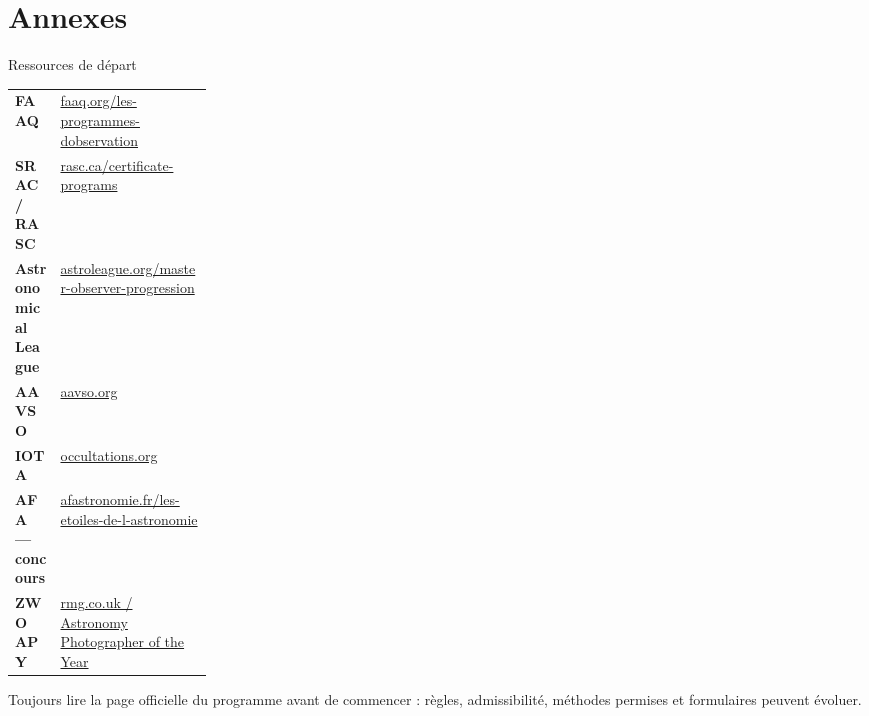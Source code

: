 \documentclass[aspectratio=169]{beamer}
\begin{document}
\appendix
\section*{Annexes}

\begin{frame}{Ressources de départ}
  \small
  \begin{tabularx}{\linewidth}{>{\bfseries}p{0.23\linewidth} X}
    FAAQ & \href{https://www.faaq.org/les-programmes-dobservation/}{faaq.org/les-programmes-dobservation} \\
    SRAC / RASC & \href{https://www.rasc.ca/certificate-programs}{rasc.ca/certificate-programs} \\
    Astronomical League & \href{https://www.astroleague.org/master-observer-progression/}{astroleague.org/master-observer-progression} \\
    AAVSO & \href{https://www.aavso.org/}{aavso.org} \\
    IOTA & \href{https://occultations.org/}{occultations.org} \\
    AFA — concours & \href{https://www.afastronomie.fr/les-etoiles-de-l-astronomie}{afastronomie.fr/les-etoiles-de-l-astronomie} \\
    ZWO APY & \href{https://www.rmg.co.uk/whats-on/astronomy-photographer-year/competition}{rmg.co.uk / Astronomy Photographer of the Year} \\
  \end{tabularx}
  \vspace{3mm}
  {\scriptsize\color{SwissMuted}Toujours lire la page officielle du programme avant de commencer : règles, admissibilité, méthodes permises et formulaires peuvent évoluer.}
\end{frame}
\end{document}
